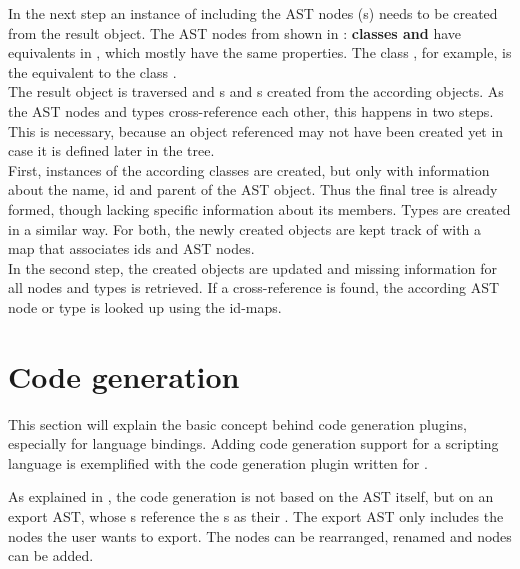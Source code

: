 In the next step an instance of  including the AST nodes (s) needs to be created from the result object. The AST nodes from  shown in : \textbf{ classes and } have equivalents in , which mostly have the same properties. The  class , for example, is the equivalent to the  class .\\
The  result object is traversed and s and s created from the according objects. As the AST nodes and types cross-reference each other, this happens in two steps. This is necessary, because an object referenced may not have been created yet in case it is defined later in the tree.\\
First, instances of the according classes are created, but only with information about the name, id and parent of the AST object. Thus the final tree is already formed, though lacking specific information about its members. Types are created in a similar way. For both, the newly created objects are kept track of with a map that associates ids and AST nodes.\\
In the second step, the created objects are updated and missing information for all nodes and types is retrieved. If a cross-reference is found, the according AST node or type is looked up using the id-maps.

\section{Code generation}

This section will explain the basic concept behind code generation plugins, especially for language bindings. Adding code generation support for a scripting language is exemplified with the code generation plugin written for .

As explained in , the code generation is not based on the  AST itself, but on an export AST, whose s reference the s as their . The export AST only includes the nodes the user wants to export. The nodes can be rearranged, renamed and  nodes can be added. 

